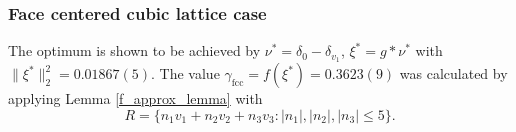 \documentclass[a4paper, 12pt, notitlepage]{amsart}
\newcommand{\fcc}{\operatorname{fcc}}
\theoremstyle{remark}
\begin{document}


 



\subsubsection{Face centered cubic lattice case} \label{fcc_section}



The optimum is shown to be achieved by $\nu^* = \delta_0 - \delta_{v_1}$, $\xi^* = g* \nu^*$ with $\|\xi^*\|_2^2 = 0.01867(5)$. The value $\gamma_{\fcc} = f(\xi^*) = 0.3623(9)$ was calculated by applying Lemma \ref{f_approx_lemma} with \begin{equation}R = \{n_1 v_1 + n_2 v_2 +n_3 v_3: |n_1|, |n_2|, |n_3| \leq 5\}.\end{equation}
\end{document}
